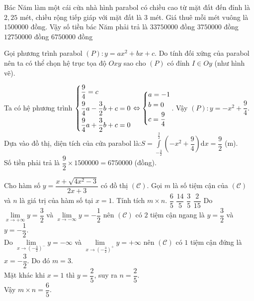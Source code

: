 \begin{ex}%
Bác Năm làm một cái cửa nhà hình parabol có chiều cao từ mặt đất đến đỉnh là $2{,}25$ mét, chiều rộng tiếp giáp với mặt đất là $3$ mét. Giá thuê mỗi mét vuông là $1500000$ đồng. Vậy số tiền bác Năm phải trả là
\choice
{$33750000$ đồng}
{$3750000$ đồng}
{$12750000$ đồng}
{\True $6750000$ đồng}
\loigiai
{Gọi phương trình parabol $(P): y=ax^2+bx+c$. Do tính đối xứng của parabol nên ta có thể chọn hệ trục tọa độ $Oxy$ sao cho $(P)$ có đỉnh $I\in Oy$ (như hình vẽ).
\begin{center}
\end{center}
Ta có hệ phương trình $\left\{\begin{aligned}&\frac{9}{4}=c\\&\frac{9}{4}a-\frac{3}{2}b+c=0\\&\frac{9}{4}a+\frac{3}{2}b+c=0\end{aligned}\right.\Leftrightarrow\left\{\begin{aligned}&a=-1\\&b=0\\&c=\frac{9}{4}\end{aligned}\right.$. Vậy $(P): y=-x^2+\dfrac{9}{4}$.\\Dựa vào đồ thị, diện tích của cửa parabol là:$S=\displaystyle\int\limits_{-\frac{3}{2}}^{\frac{3}{2}}\left(-x^2+\dfrac{9}{4}\right)\mathrm{d}x=\dfrac{9}{2}$ (m).\\Số tiền phải trả là $\dfrac{9}{2}\times 1500000=6750000$ (đồng).
}
\end{ex}

\begin{ex}%
Cho hàm số $y=\dfrac{x+\sqrt{4x^2-3}}{2x+3}$ có đồ thị $\left(\mathscr{C}\right)$. Gọi $m$ là số tiệm cận của $\left(\mathscr{C}\right)$ và $n$ là giá trị của hàm số tại $x=1$. Tính tích $m\times n$.
\choice
{\True $\dfrac{6}{5}$}
{$\dfrac{14}{5}$}
{$\dfrac{3}{5}$}
{$\dfrac{2}{15}$}
\loigiai
{
Do $\lim\limits_{x\to+\infty}y=\dfrac{3}{2}$ và $\lim\limits_{x\to-\infty}y=-\dfrac{1}{2}$ nên $\left(\mathscr{C}\right)$ có $2$ tiệm cận ngang là $y=\dfrac{3}{2}$ và $y=-\dfrac{1}{2}$.\\
Do $\lim\limits_{x\to \left(-\frac{3}{2}\right)^-}y=-\infty$ và $\lim\limits_{x\to \left(-\frac{3}{2}\right)^+}y=+\infty$ nên $\left(\mathscr{C}\right)$ có $1$ tiệm cận đứng là $x=-\dfrac{3}{2}$. Do đó $m=3$.\\Mặt khác khi $x=1$ thì $y=\dfrac{2}{5}$, suy ra $n=\dfrac{2}{5}$.\\Vậy $m\times n=\dfrac{6}{5}$.
}
\end{ex}

